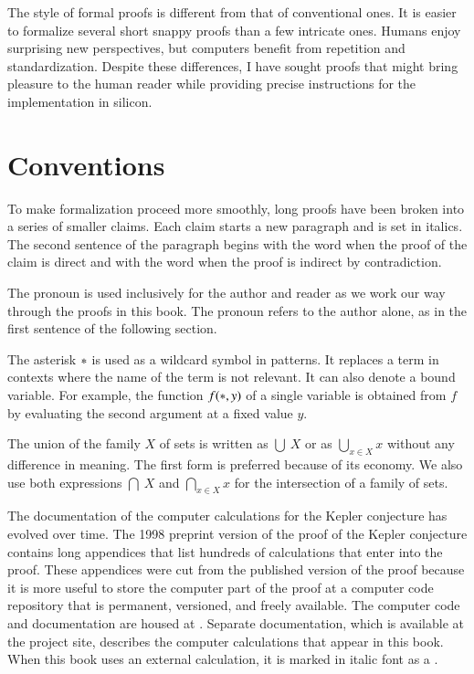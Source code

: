 The style of formal proofs is different from that of conventional
ones.  It is easier to formalize several short snappy proofs
than a few intricate ones.  Humans enjoy surprising new perspectives,
but computers benefit from repetition and standardization.  Despite
these differences, I have sought  proofs that might bring
pleasure to the human reader while providing precise instructions for
the implementation in silicon.

\section*{Conventions}

To make formalization proceed more smoothly, long proofs have been
broken into a series of smaller claims.  Each claim starts a new paragraph
and is set in italics.  The second sentence of the paragraph begins with
the word  when the proof of the claim is direct and with
the word  when the proof is indirect by contradiction.

The pronoun  is used inclusively for the author and reader as
we work our way through the proofs in this book.  The pronoun  
refers to the author alone, as in the first sentence of the following section.

The asterisk ${*}$ is used as a wildcard symbol in patterns.  It
replaces a term in contexts where the name of the term is not
relevant.  It can also denote a bound variable.  For example, the
function $f({*},y)$ of a single variable is obtained from $f$ by
evaluating the second argument at a fixed value $y$.

The union of the family $X$ of sets is written as $\bigcup\ X$ or as
$\bigcup_{x\in X} x$ without any difference in meaning.  The first form
is preferred because of its economy.  We also use both expressions
$\bigcap\ X$ and $\bigcap_{x\in X} x$ for the intersection of a family of sets.

The documentation of the computer calculations for the Kepler
conjecture has evolved over time.  The 1998 preprint version of the
proof of the Kepler conjecture contains long appendices that list
hundreds of calculations that enter into the proof.  These appendices
were cut from the published version of the proof because it is more
useful to store the computer part of the proof at a computer code
repository that is permanent, versioned, and freely available.  The
computer code and documentation are housed at .  Separate documentation, which is available at the
project site, describes the computer calculations that appear in this
book.  When this book uses an external calculation, it is marked in
italic font as a .

